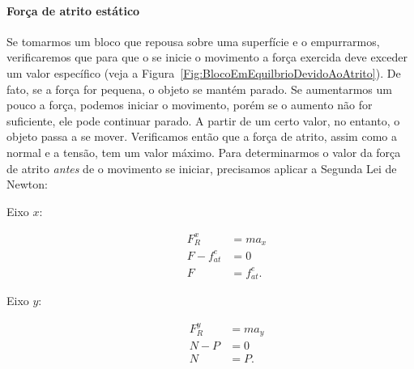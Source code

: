 \paragraph{Força de atrito estático} 

Se tomarmos um bloco que repousa sobre uma superfície e o empurrarmos, verificaremos que para que o se inicie o movimento a força exercida deve exceder um valor específico (veja a Figura~\ref{Fig:BlocoEmEquilbrioDevidoAoAtrito}). De fato, se a força for pequena, o objeto se mantém parado. Se aumentarmos um pouco a força, podemos iniciar o movimento, porém se o aumento não for suficiente, ele pode continuar parado. A partir de um certo valor, no entanto, o objeto passa a se mover. Verificamos então que a força de atrito, assim como a normal e a tensão, tem um valor máximo. Para determinarmos o valor da força de atrito \emph{antes} de o movimento se iniciar, precisamos aplicar a Segunda Lei de Newton:
\begin{description}
    \item[Eixo $x$:]
        \begin{align}
            F_R^x &= m a_x \\
            F - f_{at}^e &= 0 \\
            F &= f_{at}^e.
        \end{align}
    \item[Eixo $y$:]
        \begin{align}
            F_R^y &= m a_y \\
            N - P &= 0 \\
            N &= P.
        \end{align}
\end{description}

